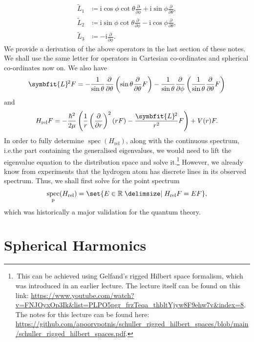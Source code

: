 \documentclass[12pt, a4 paper]{article}
\theoremstyle{definition}
\newcommand{\rr}{\mathbb{R}}
\renewcommand{\i}{\mathrm{i}}
\DeclareMathOperator{\spec}{spec}
\newcommand{\angsone}{\tilde{L}_1}
\newcommand{\angstwo}{\tilde{L}_2}
\newcommand{\angsthree}{\tilde{L}_3}
\newcommand{\lvecsquare}{\symbfit{L}\kern-1pt^2}
\begin{document}
	\begin{align*}
		\angsone &\coloneq \i \cos{\phi}\cot{\theta}\frac{\partial}{\partial\phi} + \i \sin{\phi}\frac{\partial}{\partial\theta},\\
		\angstwo &\coloneq \i \sin{\phi}\cot{\theta}\frac{\partial}{\partial\phi} - \i \cos{\phi}\frac{\partial}{\partial\theta},\\
		\angsthree &\coloneq -\i \frac{\partial}{\partial\phi}.
	\end{align*}
	We provide a derivation of the above operators in the last section of these notes. We shall use the same letter for operators in Cartesian co-ordinates and spherical co-ordinates now on. We also have
	\begin{align*}
		\lvecsquare F = -\frac{1}{\sin{\theta}}\frac{\partial}{\partial \theta}\left(\sin{\theta}\frac{\partial}{\partial\theta}F\right) -\frac{1}{\sin{\theta}}\frac{\partial}{\partial\phi}\left(\frac{1}{\sin{\theta}}\frac{\partial}{\partial\theta}F\right)
	\end{align*}
	and
	\begin{align*}
		H_\text{rel} F = -\frac{\hbar^2}{2\mu}\left(\frac{1}{r}\left(\frac{\partial}{\partial r}\right)^2 (rF) - \frac{\lvecsquare}{r^2}F\right) + V(r)F.
	\end{align*}
	In order to fully determine $\spec(H_\text{rel})$, along with the continuous spectrum, i.e.\@ the part containing the generalised eigenvalues, we would need to lift the eigenvalue equation to the distribution space and solve it.\footnote{\,This can be achieved using Gelfand's rigged Hilbert space formalism, which was introduced in an earlier lecture. The lecture itself can be found on this link: \url{https://www.youtube.com/watch?v=FNJOyxOp3Ik&list=PLPO5pgr_frzTeqa_thbltYjyw8F9ehw7v&index=8}. The notes for this lecture can be found here: \url{https://github.com/apoorvpotnis/schuller_rigged_hilbert_spaces/blob/main/schuller_rigged_hilbert_spaces.pdf}.} However, we already know from experiments that the hydrogen atom has discrete lines in its observed spectrum. Thus, we shall first solve for the point spectrum
	\begin{align*}
		\spec_{\text{p}}(H_\text{rel}) = \set{E \in \rr \given H_\text{rel} F = E F},
	\end{align*}
	which was historically a major validation for the quantum theory.

	\section{Spherical Harmonics}
\end{document}
